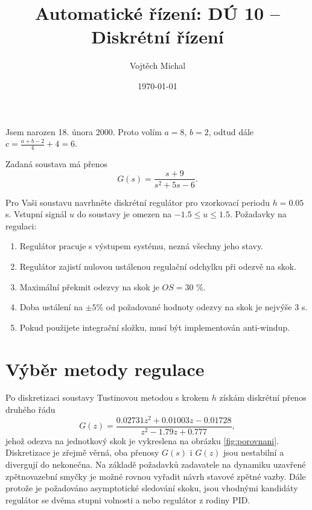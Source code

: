 \documentclass[twoside]{article}
\title{Automatické řízení: DÚ 10 -- Diskrétní řízení}
\author{Vojtěch Michal}
\date{\today}
\begin{document}
\maketitle

Jsem narozen 18. února 2000. Proto volím $a = 8$, $b = 2$, odtud dále $c = \frac{a+b-2}{4} + 4 = 6$.

Zadaná soustava má přenos 
\begin{equation}
	G(s) = \frac{s+9}{s^2+5s-6}.
\end{equation}

Pro Vaši soustavu navrhněte diskrétní regulátor pro vzorkovací periodu $h = 0.05$ \si{\second}. Vstupní signál $u$ do
soustavy je omezen na $-1.5 \le u \le 1.5$. Požadavky na regulaci:
\begin{enumerate}
	\item Regulátor pracuje s výstupem systému, nezná všechny jeho stavy.
	\item Regulátor zajistí nulovou ustálenou regulační odchylku při odezvě na skok.
	\item Maximální překmit odezvy na skok je $OS = 30$ \%.
	\item Doba ustálení na $\pm 5$\% od požadované hodnoty odezvy na skok je nejvýše $3$ \si{\second}.
	\item Pokud použijete integrační složku, musí být implementován anti-windup.
\end{enumerate}

\section{Výběr metody regulace}

Po diskretizaci soustavy Tustinovou metodou s krokem $h$ získám diskrétní přenos druhého řádu
\begin{equation}
	G(z) = \frac{  0.02731 z^2 + 0.01003 z - 0.01728}{  z^2 - 1.79 z + 0.777},
\end{equation}
jehož odezva na jednotkový skok je vykreslena na obrázku \ref{fig:porovnani}. Diskretizace je zřejmě věrná,
oba přenosy $G(s)$ i $G(z)$ jsou nestabilní a divergují do nekonečna. Na základě požadavků zadavatele na dynamiku
uzavřené zpětnovazební smyčky je možné rovnou vyřadit návrh stavové zpětné vazby. Dále protože je požadováno
asymptotické sledování skoku, jsou vhodnými kandidáty regulátor se dvěma stupni volnosti a nebo regulátor z rodiny PID.
\end{document}
